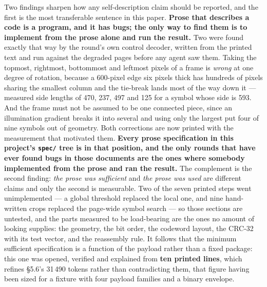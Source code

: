 \documentclass[10pt,twocolumn,letterpaper]{article}
\newcommand{\code}[1]{\texttt{\small #1}}
\begin{document}
Two findings sharpen how any self-description claim should be reported, and the first is the most transferable sentence in this paper. \textbf{Prose that describes a code is a program, and it has bugs; the only way to find them is to implement from the prose alone and run the result.} Two were found exactly that way by the round's own control decoder, written from the printed text and run against the degraded pages before any agent saw them. Taking the topmost, rightmost, bottommost and leftmost pixels of a frame is \emph{wrong} at one degree of rotation, because a 600-pixel edge six pixels thick has hundreds of pixels sharing the smallest column and the tie-break lands most of the way down it --- measured side lengths of 470, 237, 497 and 125 for a symbol whose side is 593. And the frame must not be assumed to be one connected piece, since an illumination gradient breaks it into several and using only the largest put four of nine symbols out of geometry. Both corrections are now printed with the measurement that motivated them. \textbf{Every prose specification in this project's \code{spec/} tree is in that position, and the only rounds that have ever found bugs in those documents are the ones where somebody implemented from the prose and ran the result.} The complement is the second finding: \emph{the prose was sufficient} and \emph{the prose was used} are different claims and only the second is measurable. Two of the seven printed steps went unimplemented --- a global threshold replaced the local one, and nine hand-written crops replaced the page-wide symbol search --- so those sections are untested, and the parts measured to be load-bearing are the ones no amount of looking supplies: the geometry, the bit order, the codeword layout, the CRC-32 with its test vector, and the reassembly rule. It follows that the minimum sufficient specification is a function of the payload rather than a fixed package: this one was opened, verified and explained from \textbf{ten printed lines}, which refines \S5.6's 31\,490 tokens rather than contradicting them, that figure having been sized for a fixture with four payload families and a binary envelope.
\end{document}
